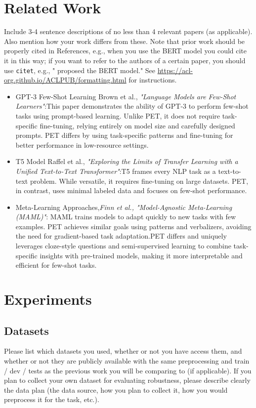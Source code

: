 \documentclass[11pt,a4paper]{article}
\begin{document}
\section{Related Work}
Include 3-4 sentence descriptions of no less than 4 relevant papers (as applicable). Also mention how your work differs from these. Note that prior work should be properly cited in References, e.g., when you use the BERT model \cite{devlin2019bert} you could cite it in this way; if you want to refer to the authors of a certain paper, you should use \texttt{citet}, e.g., "\citet{devlin2019bert} proposed the BERT model." See \url{https://acl-org.github.io/ACLPUB/formatting.html} for instructions.
\begin{itemize}
  \item GPT-3 Few-Shot Learning Brown et al., \textit{"Language Models are Few-Shot Learners"}:This paper demonstrates the ability of GPT-3 to perform few-shot tasks using prompt-based learning. Unlike PET, it does not require task-specific fine-tuning, relying entirely on model size and carefully designed prompts. PET differs by using task-specific patterns and fine-tuning for better performance in low-resource settings. 
  \item T5 Model Raffel et al., \textit{"Exploring the Limits of Transfer Learning with a Unified Text-to-Text Transformer"}:T5 frames every NLP task as a text-to-text problem. While versatile, it requires fine-tuning on large datasets. PET, in contrast, uses minimal labeled data and focuses on few-shot performance. 
  \item Meta-Learning Approaches,\textit{Finn et al., "Model-Agnostic Meta-Learning (MAML)"}: MAML trains models to adapt quickly to new tasks with few examples. PET achieves similar goals using patterns and verbalizers, avoiding the need for gradient-based task adaptation.PET differs and uniquely leverages cloze-style questions and semi-supervised learning to combine task-specific insights with pre-trained models, making it more interpretable and efficient for few-shot tasks. 
\end{itemize}

\section{Experiments}

\subsection{Datasets}
Please list which datasets you used, whether or not you have access them, and whether or not they are publicly available with the same preprocessing and train / dev / tests as the previous work you will be comparing to (if applicable). If you plan to collect your own dataset for evaluating robustness, please describe clearly the data plan (the data source, how you plan to collect it, how you would preprocess it for the task, etc.).
\end{document}
